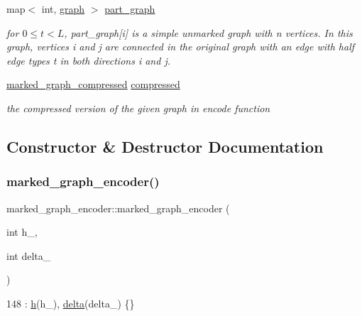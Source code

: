 \begin{DoxyCompactItemize}
map$<$ int, \hyperlink{classgraph}{graph} $>$ \hyperlink{classmarked__graph__encoder_adbafd0769ae301acc1b2c19b5e1d4844}{part\+\_\+graph}
\begin{DoxyCompactList}\small\item\em for $0 \leq t < L$, part\+\_\+graph\mbox{[}i\mbox{]} is a simple unmarked graph with n vertices. In this graph, vertices i and j are connected in the original graph with an edge with half edge types t in both directions i and j. \end{DoxyCompactList}\item 
\hyperlink{classmarked__graph__compressed}{marked\+\_\+graph\+\_\+compressed} \hyperlink{classmarked__graph__encoder_ac2ded200860fdd2321f86dd76b28bcb3}{compressed}
\begin{DoxyCompactList}\small\item\em the compressed version of the given graph in encode function \end{DoxyCompactList}\end{DoxyCompactItemize}


\subsection{Constructor \& Destructor Documentation}
\mbox{\label{classmarked__graph__encoder_a128d2a38b23ce620c77d00a5eff487ea}} 
\subsubsection{\texorpdfstring{marked\+\_\+graph\+\_\+encoder()}{marked\_graph\_encoder()}}
{\footnotesize\ttfamily marked\+\_\+graph\+\_\+encoder\+::marked\+\_\+graph\+\_\+encoder (\begin{DoxyParamCaption}\item[{int}]{h\+\_\+,  }\item[{int}]{delta\+\_\+ }\end{DoxyParamCaption})\hspace{0.3cm}{\ttfamily [inline]}}


\begin{DoxyCode}
148 : \hyperlink{classmarked__graph__encoder_ae7f8872c57d2d64e4ca6cc47387b9b58}{h}(h\_), \hyperlink{classmarked__graph__encoder_a29dcf42526b12cf7964a556bb1025c9b}{delta}(delta\_) \{\}
\end{DoxyCode}


